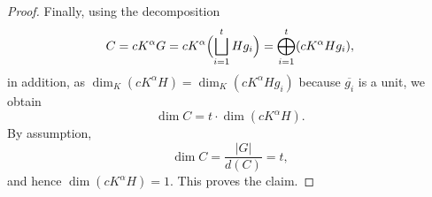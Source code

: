 \documentclass[10pt,a4paper]{amsart}
\begin{document}
\begin{proof}
Finally, using the decomposition
\[
C = c K^\alpha G
= c K^\alpha \Bigl( \bigsqcup_{i=1}^t H g_i \Bigr)
= \bigoplus_{i=1}^t (c K^\alpha Hg_i) ,
\]
in addition, as $\dim_K(cK^\alpha H )=\dim_K(cK^\alpha H g_i )$ because $\overline{g_i}$ is a unit, we obtain
\[
\dim C = t \cdot \dim(c K^\alpha H).
\]
By assumption,
\[
\dim C = \frac{|G|}{d(C)} = t,
\]
and hence $\dim(c K^\alpha H) = 1$.
This proves the claim.
\end{proof}
\end{document}
